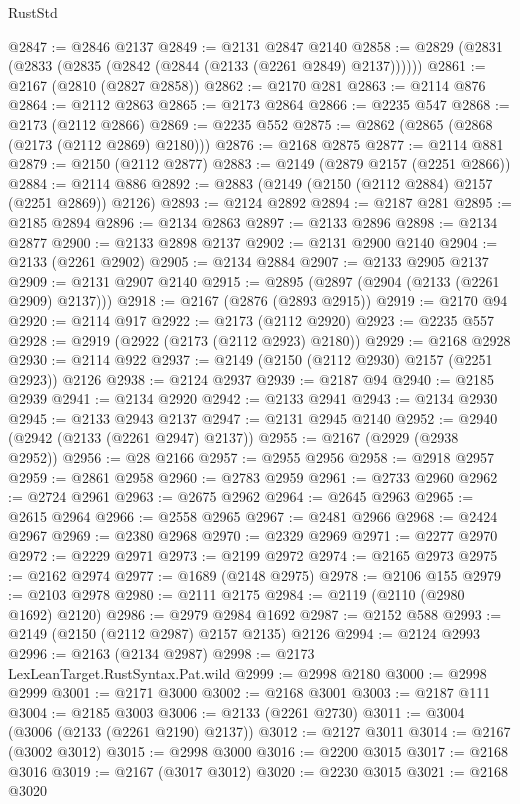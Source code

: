 \begin{lexlean}{RustStd}
\begin{coremodule}
@2847 := @2846 @2137
@2849 := @2131 @2847 @2140
@2858 := @2829 (@2831 (@2833 (@2835 (@2842 (@2844 (@2133 (@2261 @2849) @2137))))))
@2861 := @2167 (@2810 (@2827 @2858))
@2862 := @2170 @281
@2863 := @2114 @876
@2864 := @2112 @2863
@2865 := @2173 @2864
@2866 := @2235 @547
@2868 := @2173 (@2112 @2866)
@2869 := @2235 @552
@2875 := @2862 (@2865 (@2868 (@2173 (@2112 @2869) @2180)))
@2876 := @2168 @2875
@2877 := @2114 @881
@2879 := @2150 (@2112 @2877)
@2883 := @2149 (@2879 @2157 (@2251 @2866))
@2884 := @2114 @886
@2892 := @2883 (@2149 (@2150 (@2112 @2884) @2157 (@2251 @2869)) @2126)
@2893 := @2124 @2892
@2894 := @2187 @281
@2895 := @2185 @2894
@2896 := @2134 @2863
@2897 := @2133 @2896
@2898 := @2134 @2877
@2900 := @2133 @2898 @2137
@2902 := @2131 @2900 @2140
@2904 := @2133 (@2261 @2902)
@2905 := @2134 @2884
@2907 := @2133 @2905 @2137
@2909 := @2131 @2907 @2140
@2915 := @2895 (@2897 (@2904 (@2133 (@2261 @2909) @2137)))
@2918 := @2167 (@2876 (@2893 @2915))
@2919 := @2170 @94
@2920 := @2114 @917
@2922 := @2173 (@2112 @2920)
@2923 := @2235 @557
@2928 := @2919 (@2922 (@2173 (@2112 @2923) @2180))
@2929 := @2168 @2928
@2930 := @2114 @922
@2937 := @2149 (@2150 (@2112 @2930) @2157 (@2251 @2923)) @2126
@2938 := @2124 @2937
@2939 := @2187 @94
@2940 := @2185 @2939
@2941 := @2134 @2920
@2942 := @2133 @2941
@2943 := @2134 @2930
@2945 := @2133 @2943 @2137
@2947 := @2131 @2945 @2140
@2952 := @2940 (@2942 (@2133 (@2261 @2947) @2137))
@2955 := @2167 (@2929 (@2938 @2952))
@2956 := @28 @2166
@2957 := @2955 @2956
@2958 := @2918 @2957
@2959 := @2861 @2958
@2960 := @2783 @2959
@2961 := @2733 @2960
@2962 := @2724 @2961
@2963 := @2675 @2962
@2964 := @2645 @2963
@2965 := @2615 @2964
@2966 := @2558 @2965
@2967 := @2481 @2966
@2968 := @2424 @2967
@2969 := @2380 @2968
@2970 := @2329 @2969
@2971 := @2277 @2970
@2972 := @2229 @2971
@2973 := @2199 @2972
@2974 := @2165 @2973
@2975 := @2162 @2974
@2977 := @1689 (@2148 @2975)
@2978 := @2106 @155
@2979 := @2103 @2978
@2980 := @2111 @2175
@2984 := @2119 (@2110 (@2980 @1692) @2120)
@2986 := @2979 @2984 @1692
@2987 := @2152 @588
@2993 := @2149 (@2150 (@2112 @2987) @2157 @2135) @2126
@2994 := @2124 @2993
@2996 := @2163 (@2134 @2987)
@2998 := @2173 LexLeanTarget.RustSyntax.Pat.wild
@2999 := @2998 @2180
@3000 := @2998 @2999
@3001 := @2171 @3000
@3002 := @2168 @3001
@3003 := @2187 @111
@3004 := @2185 @3003
@3006 := @2133 (@2261 @2730)
@3011 := @3004 (@3006 (@2133 (@2261 @2190) @2137))
@3012 := @2127 @3011
@3014 := @2167 (@3002 @3012)
@3015 := @2998 @3000
@3016 := @2200 @3015
@3017 := @2168 @3016
@3019 := @2167 (@3017 @3012)
@3020 := @2230 @3015
@3021 := @2168 @3020

\end{coremodule}
\end{lexlean}
